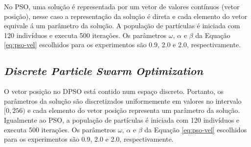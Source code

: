 No PSO, uma solução é representada por um vetor de valores contínuos (vetor posição), nesse caso a representação da solução é direta e cada elemento do vetor equivale á um parâmetro da solução. A população de partículas é iniciada com 120 indivíduos e executa 500 iterações. Os parâmetros $\omega$, $\alpha$ e $\beta$ da Equação \ref{eq:pso-vel} escolhidos para os experimentos são 0.9, 2.0 e 2.0, respectivamente.

\subsection{\textit{Discrete Particle Swarm Optimization}}

O vetor posição no DPSO está contido num espaço discreto. Portanto, os parâmetros da solução são discretizados uniformemente em valores no intervalo $[0, 256)$ e cada elemento do vetor posição representa um parâmetro da solução. Igualmente ao PSO, a população de partículas é iniciada com 120 indivíduos e executa 500 iterações. Os parâmetros $\omega$, $\alpha$ e $\beta$ da Equação \ref{eq:pso-vel} escolhidos para os experimentos são 0.9, 2.0 e 2.0, respectivamente.


